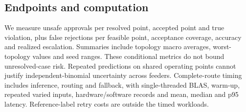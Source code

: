 \subsection{Endpoints and computation}

We measure unsafe approvals per resolved point, accepted point and true violation, plus false rejections per feasible point, acceptance coverage, accuracy and realized escalation. Summaries include topology macro averages, worst-topology values and seed ranges. These conditional metrics do not bound unresolved-case risk. Repeated predictions on shared operating points cannot justify independent-binomial uncertainty across feeders. Complete-route timing includes inference, routing and fallback, with single-threaded BLAS, warm-up, repeated varied inputs, hardware/software records and mean, median and p95 latency. Reference-label retry costs are outside the timed workloads.
